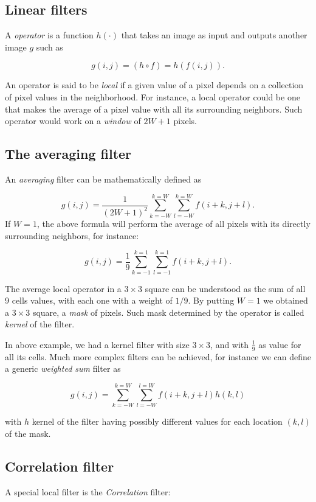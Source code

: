 \documentclass[10pt]{report}
\begin{document}
\subsection{Linear filters}
\label{linear-filters-1}
A \emph{operator} is a function \(h(\cdot)\) that takes an image as input and
outputs another image \(g\) such as

\[ g(i, j) = (h \circ f) = h(f(i, j)).\]

An operator is said to be \emph{local} if a given value of a pixel depends on
a collection of pixel values in the neighborhood. For instance, a local
operator could be one that makes the average of a pixel value with all
its surrounding neighbors. Such operator would work on a \emph{window} of
\(2W + 1\) pixels.

\subsection{The averaging filter}
\label{the-averaging-filter}
An \emph{averaging} filter can be mathematically defined as

\[ g(i, j) = \frac{1}{(2W + 1)^2} \sum_{k = -W}^{k=W} \sum_{l = -W}^{k=W} f(i + k, j + l).\]
If \(W=1\), the above formula will perform the average of all pixels
with its directly surrounding neighbors, for instance:

\[ g(i, j) = \frac{1}{9} \sum_{k = -1}^{k=1} \sum_{l = -1}^{k=1} f(i + k, j + l).\]

The average local operator in a \(3 \times 3\) square can be understood
as the sum of all 9 cells values, with each one with a weight of
\(1/9\). By putting \(W=1\) we obtained a \(3 \times 3\) square, a
\emph{mask} of pixels. Such mask determined by the operator is called
\emph{kernel} of the filter.

In above example, we had a kernel filter with size \(3 \times 3\), and
with \(\frac{1}{9}\) as value for all its cells. Much more complex
filters can be achieved, for instance we can define a generic \emph{weighted
sum} filter as

\[ g(i, j) = \sum_{k = -W}^{k = W} \sum_{l = -W}^{l = W} f(i + k, j + l) h(k, l)\]

with \(h\) kernel of the filter having possibly different values for
each location \((k, l)\) of the mask.

\subsection{Correlation filter}
\label{correlation-filter}
A special local filter is the \emph{Correlation} filter:
\end{document}
